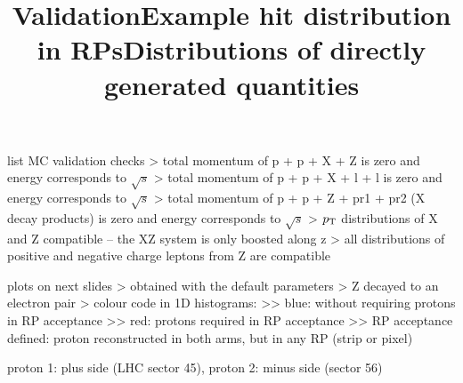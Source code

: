 \newpage %
\title{Validation}

\> list MC validation checks
\>> total momentum of p + p + X + Z is zero and energy corresponds to $\sqrt s$
\>> total momentum of p + p + X + l + l is zero and energy corresponds to $\sqrt s$
\>> total momentum of p + p + Z + pr1 + pr2 (X decay products) is zero and energy corresponds to $\sqrt s$
\>> $p_{\rm T}$ distributions of X and Z compatible -- the XZ system is only boosted along z
\>> all distributions of positive and negative charge leptons from Z are compatible

\> plots on next slides
\>> obtained with the default parameters
\>> Z decayed to an electron pair
\>> colour code in 1D histograms:
\>>> blue: without requiring protons in RP acceptance
\>>> red: protons required in RP acceptance
\>>> RP acceptance defined: proton reconstructed in both arms, but in any RP (strip or pixel)


\newpage %
\title{Example hit distribution in RPs}

\centerline{}


\newpage %
\title{Distributions of directly generated quantities}

\centerline{}

\newpage %

\> proton 1: plus side (LHC sector 45), proton 2: minus side (sector 56)

\centerline{}


\newpage %

\centerline{}


\newpage %

\centerline{}


\newpage %

